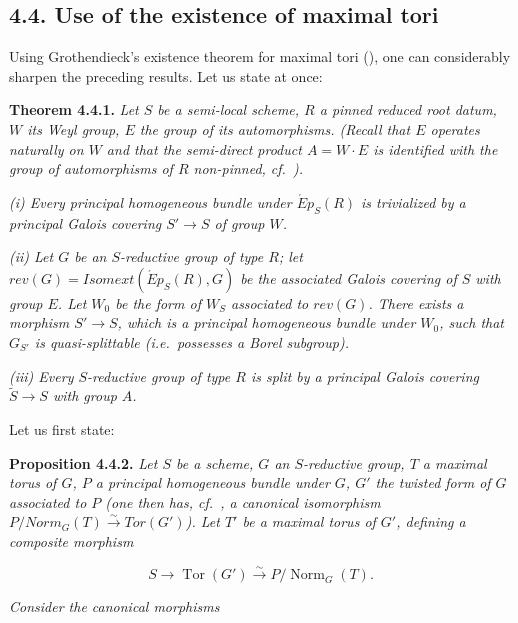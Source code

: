 \subsection*{4.4. Use of the existence of maximal tori}

Using Grothendieck's existence theorem for maximal tori (), one can considerably sharpen the preceding
results. Let us state at once:

\textbf{Theorem 4.4.1.} \emph{Let \(S\) be a semi-local scheme, \(R\) a pinned reduced root datum, \(W\) its Weyl group, \(E\) the group
of its automorphisms. (Recall that \(E\) operates naturally on \(W\) and that the semi-direct product \(A = W \cdot E\) is
identified with the group of automorphisms of \(R\) non-pinned, cf.~).}

\emph{(i) Every principal homogeneous bundle under \(\acute{E}p_{S}(R)\) is trivialized by a principal Galois covering \(S' \to
S\) of group \(W\).}

\emph{(ii) Let \(G\) be an \(S\)-reductive group of type \(R\); let \(rev(G) = Isomext(\acute{E}p_{S}(R), G)\) be the associated
Galois covering of \(S\) with group \(E\). Let \(W_0\) be the form of \(W_S\) associated to \(rev(G)\). There exists a morphism
\(S' \to S\), which is a principal homogeneous bundle under \(W_0\), such that \(G_{S'}\) is quasi-splittable (i.e.~possesses
a Borel subgroup).}

\emph{(iii) Every \(S\)-reductive group of type \(R\) is split by a principal Galois covering \(\tilde{S} \to S\) with group \(A\).}

Let us first state:

\textbf{Proposition 4.4.2.} \emph{Let \(S\) be a scheme, \(G\) an \(S\)-reductive group, \(T\) a maximal torus of \(G\), \(P\) a principal
homogeneous bundle under \(G\), \(G'\) the twisted form of \(G\) associated to \(P\) (one then has, cf.~, a canonical
isomorphism \(P / Norm_{G}(T) \xrightarrow{\sim} Tor(G')\)). Let \(T'\) be a maximal torus of \(G'\), defining a composite
morphism}

\[
  S\longrightarrow\operatorname{Tor}(G')
  \xrightarrow{\sim}P/\operatorname{Norm}_G(T).
\]

\emph{Consider the canonical morphisms}

